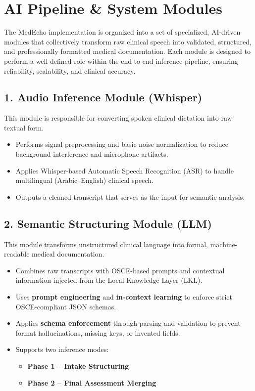 \section{AI Pipeline \& System Modules}
\label{sec:impl:pipeline}

The MedEcho implementation is organized into a set of specialized, AI-driven modules that collectively transform raw clinical speech into validated, structured, and professionally formatted medical documentation. Each module is designed to perform a well-defined role within the end-to-end inference pipeline, ensuring reliability, scalability, and clinical accuracy.

\subsection*{1. Audio Inference Module (Whisper)}

This module is responsible for converting spoken clinical dictation into raw textual form.

\begin{itemize}
    \item Performs signal preprocessing and basic noise normalization to reduce background interference and microphone artifacts.
    \item Applies Whisper-based Automatic Speech Recognition (ASR) to handle multilingual (Arabic–English) clinical speech.
    \item Outputs a cleaned transcript that serves as the input for semantic analysis.
\end{itemize}

\subsection*{2. Semantic Structuring Module (LLM)}

This module transforms unstructured clinical language into formal, machine-readable medical documentation.

\begin{itemize}
    \item Combines raw transcripts with OSCE-based prompts and contextual information injected from the Local Knowledge Layer (LKL).
    \item Uses \textbf{prompt engineering} and \textbf{in-context learning} to enforce strict OSCE-compliant JSON schemas.
    \item Applies \textbf{schema enforcement} through parsing and validation to prevent format hallucinations, missing keys, or invented fields.
    \item Supports two inference modes:
    \begin{itemize}
        \item \textbf{Phase 1 – Intake Structuring}
        \item \textbf{Phase 2 – Final Assessment Merging}
    \end{itemize}
\end{itemize}

